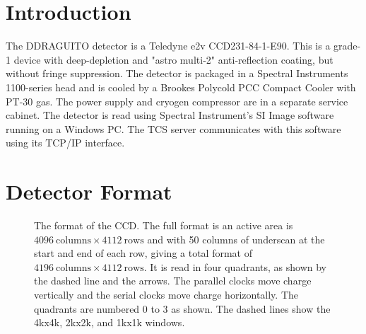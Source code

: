 \documentclass{article}
\newcommand{\code}[1]{{\ttfamily #1}}
\begin{document}

\section{Introduction}

The DDRAGUITO detector is a Teledyne e2v CCD231-84-1-E90. This is a grade-1 device with deep-depletion and "astro multi-2" anti-reflection coating, but without fringe suppression. The detector is packaged in a Spectral Instruments 1100-series head and is cooled by a Brookes Polycold PCC Compact Cooler with PT-30 gas. The power supply and cryogen compressor are in a separate service cabinet. The detector is read using Spectral Instrument's SI Image software running on a Windows PC. The TCS server communicates with this software using its TCP/IP interface. 

\section{Detector Format}

\begin{figure}
\begin{center}
\caption{The format of the CCD. The full format is an active area is $4096~\mbox{columns} \times 4112~\mbox{rows}$ and with 50 columns of underscan at the start and end of each row, giving a total format of $4196~\mbox{columns} \times 4112~\mbox{rows}$. It is read in four quadrants, as shown by the dashed line and the arrows. The parallel clocks move charge vertically and the serial clocks move charge horizontally. The quadrants are numbered 0 to 3 as shown. The dashed lines show the \code{4kx4k}, \code{2kx2k}, and \code{1kx1k} windows.}
\label{figure:format}
\end{center}
\end{figure}
\end{document}
